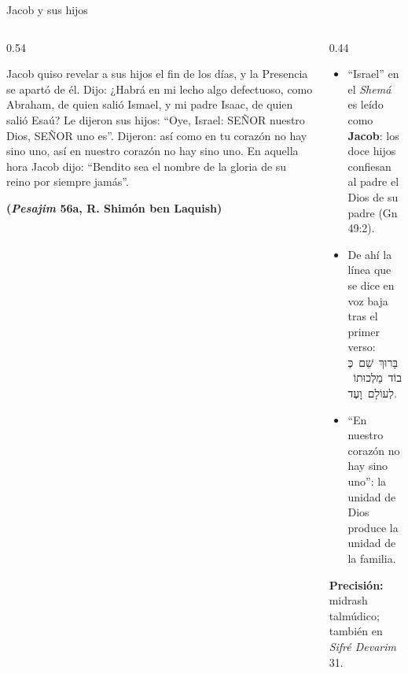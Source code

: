 \documentclass[hyperref={bookmarks=false},aspectratio=169]{beamer}
\newcommand{\heb}[1]{\mbox{\foreignlanguage{hebrew}{#1}}}
\newcommand{\SENOR}{S{\fontsize{0.78em}{1em}\selectfont EÑOR}}
\newcommand{\fuente}[1]{\par\hfill{\upshape\bfseries\footnotesize\textcolor{azul}{#1}}}
\newcommand{\destacar}[1]{\textbf{\textcolor{azul}{#1}}}
\newcommand{\precision}[1]{{\footnotesize\color{gris}\textbf{Precisión:} #1}}
\begin{document}
\begin{frame}{Jacob y sus hijos}
\begin{columns}[t,onlytextwidth]
\begin{column}{0.54\textwidth}
\begin{cita}[colback=dorado!10!papiro,colframe=dorado!80!azul,fontupper=\scriptsize\itshape]Jacob quiso revelar a sus hijos el fin de los días, y la Presencia se apartó de él. Dijo: ¿Habrá en mi lecho algo defectuoso, como Abraham, de quien salió Ismael, y mi padre Isaac, de quien salió Esaú? Le dijeron sus hijos: ``Oye, Israel: \SENOR{} nuestro Dios, \SENOR{} uno es''. Dijeron: así como en tu corazón no hay sino uno, así en nuestro corazón no hay sino uno. En aquella hora Jacob dijo: ``Bendito sea el nombre de la gloria de su reino por siempre jamás''.\fuente{(\emph{Pesajim} 56a, R. Shimón ben Laquish)}\end{cita}
\end{column}
\begin{column}{0.44\textwidth}\small
\begin{itemize}
\item ``Israel'' en el \emph{Shemá} es leído como \destacar{Jacob}: los doce hijos confiesan al padre el Dios de su padre (Gn 49:2).
\item De ahí la línea que se dice en voz baja tras el primer verso: \heb{בָּרוּךְ שֵׁם כְּבוֹד מַלְכוּתוֹ לְעוֹלָם וָעֶד}.
\item ``En nuestro corazón no hay sino uno'': la unidad de Dios produce la unidad de la familia.
\end{itemize}
\precision{midrash talmúdico; también en \emph{Sifré Devarim} 31.}
\end{column}
\end{columns}
\end{frame}
\end{document}
